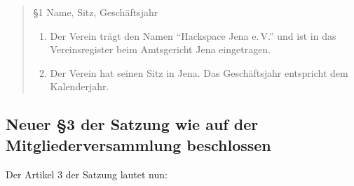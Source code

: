 \documentclass{scrartcl}
\begin{document}
\begin{quote}
\label{sec:new_para_1}

§1 Name, Sitz, Geschäftsjahr

	\begin{enumerate}
		\item Der Verein trägt den Namen "`Hackspace Jena e.\,V."' und ist in das
			Vereinsregister beim Amtsgericht Jena eingetragen.
		\item Der Verein hat seinen Sitz in Jena. Das Geschäftsjahr entspricht
			dem Kalenderjahr.
	\end{enumerate}
\end{quote}

\subsection{Neuer §3 der Satzung wie auf der Mitgliederversammlung beschlossen} 
\label{sec:new_para_3}
Der Artikel 3 der Satzung lautet nun:
\end{document}

